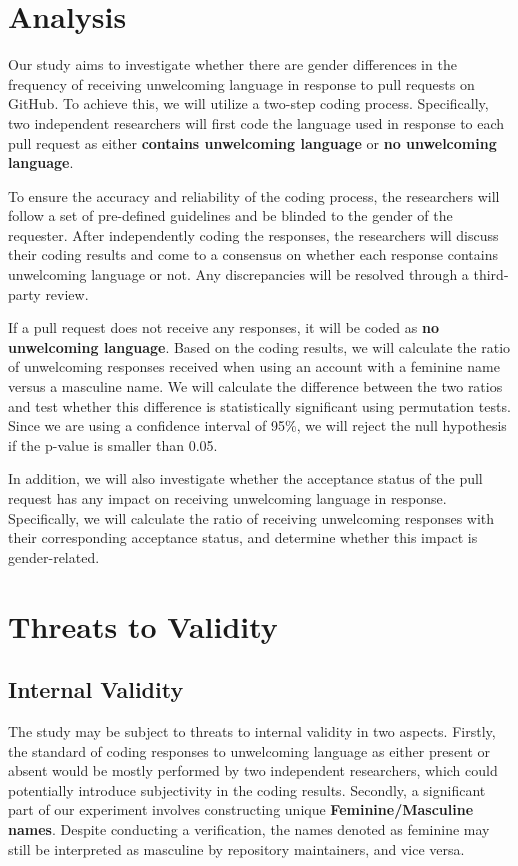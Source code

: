 \documentclass[journal,12pt,onecolumn,]{IEEEtran}
\begin{document}
\section{Analysis}

Our study aims to investigate whether there are gender differences in the frequency of receiving unwelcoming language in response to pull requests on GitHub.
To achieve this, we will utilize a two-step coding process.
Specifically, two independent researchers will first code the language used in response to each pull request as either \textbf{contains unwelcoming language} or \textbf{no unwelcoming language}.

To ensure the accuracy and reliability of the coding process, the researchers will follow a set of pre-defined guidelines and be blinded to the gender of the requester.
After independently coding the responses, the researchers will discuss their coding results and come to a consensus on whether each response contains unwelcoming language or not.
Any discrepancies will be resolved through a third-party review.

If a pull request does not receive any responses, it will be coded as \textbf{no unwelcoming language}.
Based on the coding results, we will calculate the ratio of unwelcoming responses received when using an account with a feminine name versus a masculine name.
We will calculate the difference between the two ratios and test whether this difference is statistically significant using permutation tests. Since we are using a confidence interval of 95\%, we will reject the null hypothesis if the p-value is smaller than 0.05.

In addition, we will also investigate whether the acceptance status of the pull request has any impact on receiving unwelcoming language in response.
Specifically, we will calculate the ratio of receiving unwelcoming responses with their corresponding acceptance status, and determine whether this impact is gender-related.


\section{Threats to Validity}

\subsection{Internal Validity}
The study may be subject to threats to internal validity in two aspects. Firstly, the standard of coding responses to unwelcoming language as either present or absent would be mostly performed by two independent researchers, which could potentially introduce subjectivity in the coding results. Secondly, a significant part of our experiment involves constructing unique \textbf{Feminine/Masculine names}. Despite conducting a verification, the names denoted as feminine may still be interpreted as masculine by repository maintainers, and vice versa.
\end{document}
